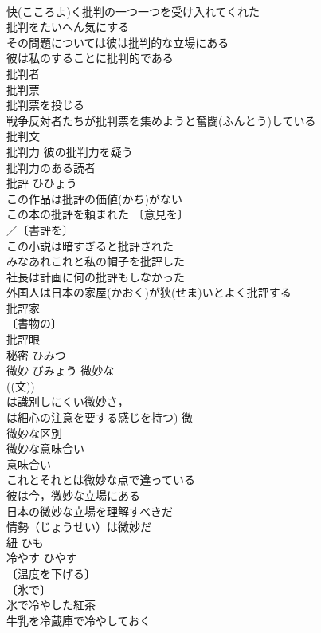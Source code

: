 \documentclass[8pt]{extreport}
\begin{document}
\begin{CJK}{UTF8}{min}
\\	快(こころよ)く批判の一つ一つを受け入れてくれた 
\\	批判をたいへん気にする 
\\	その問題については彼は批判的な立場にある 
\\	彼は私のすることに批判的である 
\\	批判者 
\\	批判票 
\\	批判票を投じる 
\\	戦争反対者たちが批判票を集めようと奮闘(ふんとう)している 
\\	批判文 
\\	批判力 彼の批判力を疑う 
\\	批判力のある読者 
\\	批評	ひひょう	
\\	この作品は批評の価値(かち)がない 
\\	この本の批評を頼まれた 〔意見を〕
\\	／〔書評を〕
\\	この小説は暗すぎると批評された 
\\	みなあれこれと私の帽子を批評した 
\\	社長は計画に何の批評もしなかった 
\\	外国人は日本の家屋(かおく)が狭(せま)いとよく批評する 
\\	批評家 
\\	〔書物の〕
\\	批評眼 
\\	秘密	ひみつ	
\\	微妙	びみょう	微妙な 
\\	((文)) 
\\	は識別しにくい微妙さ，
\\	は細心の注意を要する感じを持つ) 微　
\\	微妙な区別 
\\	微妙な意味合い 
\\	意味合い　
\\	これとそれとは微妙な点で違っている 
\\	彼は今，微妙な立場にある 
\\	日本の微妙な立場を理解すべきだ 
\\	情勢（じょうせい）は微妙だ 
\\	紐	ひも	
\\	冷やす	ひやす	
\\	〔温度を下げる〕
\\	〔氷で〕
\\	氷で冷やした紅茶 
\\	牛乳を冷蔵庫で冷やしておく 

\end{CJK}
\end{document}
